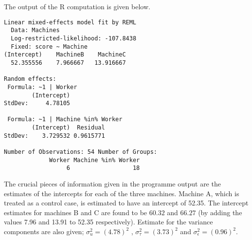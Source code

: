 \documentclass[main.tex]{subfiles}
\begin{document}
The output of the R computation is given below.
\begin{verbatim}
Linear mixed-effects model fit by REML
  Data: Machines
  Log-restricted-likelihood: -107.8438
  Fixed: score ~ Machine
(Intercept)    MachineB    MachineC
  52.355556    7.966667   13.916667

Random effects:
 Formula: ~1 | Worker
        (Intercept)
StdDev:     4.78105

 Formula: ~1 | Machine %in% Worker
        (Intercept)  Residual
StdDev:    3.729532 0.9615771

Number of Observations: 54 Number of Groups:
             Worker Machine %in% Worker
                  6                  18

\end{verbatim}

\newpage
The crucial pieces of information given in the programme output
are the estimates of the intercepts for each of the three
machines. Machine A, which is treated as a control case, is
estimated to have an intercept of 52.35. The intercept estimates
for machines B and C are found to be $60.32$ and $66.27$ (by
adding the values 7.96 and 13.91 to 52.35 respectively). Estimate
for the variance components are also given; $\sigma^{2}_{u} =
(4.78)^{2}$ , $\sigma^{2}_{\tau} = (3.73)^{2}$ and
$\sigma^{2}_{\epsilon} = (0.96)^{2}$.
\end{document}
